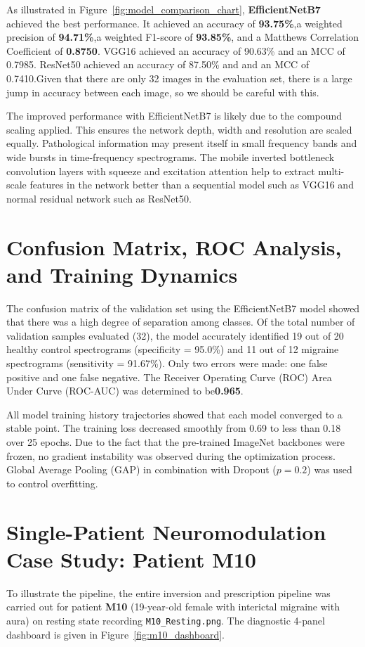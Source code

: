 \documentclass[12pt, a4paper]{report}
\begin{document}
As illustrated in Figure~\ref{fig:model_comparison_chart}, \textbf{EfficientNetB7} achieved the best performance. It achieved an accuracy of \textbf{93.75\%},a weighted precision of \textbf{94.71\%},a weighted F1-score of \textbf{93.85\%}, and a Matthews Correlation Coefficient of \textbf{0.8750}. VGG16 achieved an accuracy of 90.63\% and an MCC of 0.7985. ResNet50 achieved an accuracy of 87.50\% and and an MCC of 0.7410.Given that there are only 32 images in the evaluation set, there is a large jump in accuracy between each image, so we should be careful with this.

The improved performance with EfficientNetB7 is likely due to the compound scaling applied. This ensures the network depth, width and resolution are scaled equally. Pathological information may present itself in small frequency bands and wide bursts in time-frequency spectrograms. The mobile inverted bottleneck convolution layers with squeeze and excitation attention help to extract multi-scale features in the network better than a sequential model such as VGG16 and normal residual network such as ResNet50.



\section{Confusion Matrix, ROC Analysis, and Training Dynamics}
\label{sec:roc_confusion}

The confusion matrix of the validation set using the EfficientNetB7 model showed that there was a high degree of separation among classes. Of the total number of validation samples evaluated (32), the model accurately identified 19 out of 20 healthy control spectrograms (specificity = 95.0\%) and 11 out of 12 migraine spectrograms (sensitivity = 91.67\%). Only two errors were made: one false positive and one false negative. The Receiver Operating Curve (ROC) Area Under Curve (ROC-AUC) was determined to be\textbf{0.965}.


All model training history trajectories showed that each model converged to a stable point. The training loss decreased smoothly from 0.69 to less than 0.18 over 25 epochs. Due to the fact that the pre-trained ImageNet backbones were frozen, no gradient instability was observed during the optimization process. Global Average Pooling (GAP) in combination with Dropout ($p=0.2$) was used to control overfitting.


\section{Single-Patient Neuromodulation Case Study: Patient M10}
\label{sec:case_study_m10}
To illustrate the pipeline, the entire inversion and prescription pipeline was carried out for patient \textbf{M10} (19-year-old female with interictal migraine with aura) on resting state recording \texttt{M10\_Resting.png}. The diagnostic 4-panel dashboard is given in Figure~\ref{fig:m10_dashboard}.
\end{document}
